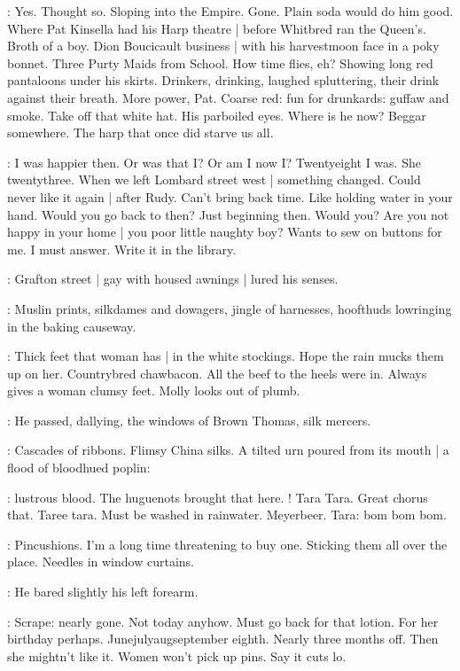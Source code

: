 \BloomInt:
Yes.
Thought so.
Sloping into the Empire.
Gone.
Plain soda would do him good.
Where Pat Kinsella had his Harp theatre |
before Whitbred ran the Queen's.
Broth of a boy.
Dion Boucicault business |
with his harvestmoon face in a poky bonnet.
Three Purty Maids from School.
How time flies, eh?
Showing long red pantaloons under his skirts.
Drinkers, drinking, laughed spluttering,
their drink against their breath.
More power, Pat.
Coarse red:
fun for drunkards:
guffaw and smoke.
Take off that white hat.
His parboiled eyes.
Where is he now?
Beggar somewhere.
The harp that once did starve us all.

\BloomInt:
I was happier then.
Or was that I?
Or am I now I?
Twentyeight I was.
She twentythree.
When we left Lombard street west |
something changed.
Could never like it again |
after Rudy.
Can't bring back time.
Like holding water in your hand.
Would you go back to then?
Just beginning then.
Would you?
Are you not happy in your home |
you poor little naughty boy?
Wants to sew on buttons for me.
I must answer.
Write it in the library.

:
Grafton street |
gay with housed awnings |
lured his senses.

:
Muslin prints, silkdames and dowagers,
jingle of harnesses,
hoofthuds lowringing in the baking causeway.

\BloomInt:
Thick feet that woman has |
in the white stockings.
Hope the rain mucks them up on her.
Countrybred chawbacon.
All the beef to the heels were in.
Always gives a woman clumsy feet.
Molly looks out of plumb.

:
He passed, dallying,
the windows of Brown Thomas, silk mercers.

:
Cascades of ribbons.
Flimsy China silks.
A tilted urn poured from its mouth |
a flood of bloodhued poplin:

\BloomInt:
lustrous blood.
The huguenots brought that here.
!
Tara Tara.
Great chorus that.
Taree tara.
Must be washed in rainwater.
Meyerbeer.
Tara:
bom bom bom.

\BloomInt:
Pincushions.
I'm a long time threatening to buy one.
Sticking them all over the place.
Needles in window curtains.

:
He bared slightly his left forearm.

\BloomInt:
Scrape: nearly gone.
Not today anyhow.
Must go back for that lotion.
For her birthday perhaps.
June\-july\-aug\-september eighth.
Nearly three months off.
Then she mightn't like it.
Women won't pick up pins.
Say it cuts lo.

